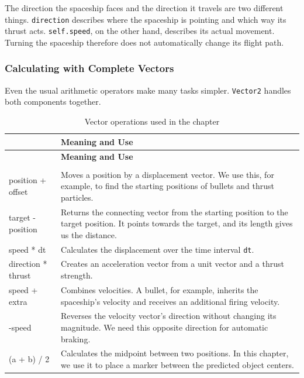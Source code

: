 \begin{hintbox}
	The direction the spaceship faces and the direction it travels are two different things. \texttt{direction} describes where the spaceship is pointing and which way its thrust acts. \texttt{self.speed}, on the other hand, describes its actual movement. Turning the spaceship therefore does not automatically change its flight path.
\end{hintbox}

\newpage
\subsubsection*{Calculating with Complete Vectors}

Even the usual arithmetic operators make many tasks simpler. \texttt{Vector2} handles both components together.

\begin{longtable}{>{\ttfamily}lp{11cm}}
	\caption{Vector operations used in the chapter}
	\label{tabVectorSummaryOperations}\\
	\toprule
	{\normalfont\textbf{Expression}} & \textbf{Meaning and Use} \\
	\midrule
	\endfirsthead
	
	\toprule
	{\normalfont\textbf{Expression}} & \textbf{Meaning and Use} \\
	\midrule
	\endhead
	
	\midrule
	\multicolumn{2}{r}{\emph{Continued on the next page}} \\
	\endfoot
	
	\bottomrule
	\endlastfoot
	
	position + offset
	& Moves a position by a displacement vector.
	We use this, for example, to find the starting positions of bullets and thrust particles. \\
	
	target - position
	& Returns the connecting vector from the starting position to the target position. It points towards the target, and its length gives us the distance. \\
	
	speed * dt
	& Calculates the displacement over the time interval \texttt{dt}. \\
	
	direction * thrust
	& Creates an acceleration vector from a unit vector and a thrust strength. \\
	
	speed + extra
	& Combines velocities. A bullet, for example, inherits the spaceship's velocity and receives an additional firing velocity. \\
	
	-speed
	& Reverses the velocity vector's direction without changing its magnitude. We need this opposite direction for automatic braking. \\
	
	(a + b) / 2
	& Calculates the midpoint between two positions. In this chapter, we use it to place a marker between the predicted object centers. \\
\end{longtable}

